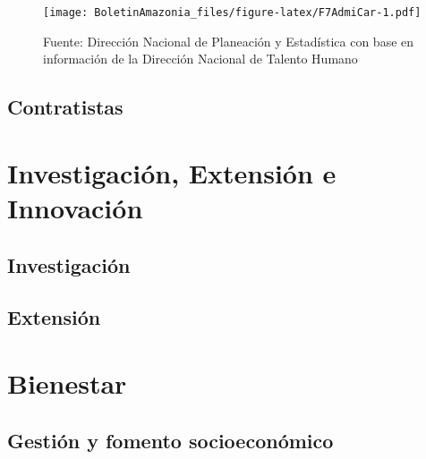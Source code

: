 \documentclass[
]{book}
\begin{document}
\begin{figure}
\centering
\texttt{[image: BoletinAmazonia\_files/figure-latex/F7AdmiCar-1.pdf]}
\caption{\label{fig:F7AdmiCar}Fuente: Dirección Nacional de Planeación y Estadística con base en información de la Dirección Nacional de Talento Humano}
\end{figure}

\hypertarget{Contrat}{%
\section{Contratistas}\label{Contrat}}

\hypertarget{Inv}{%
\chapter{Investigación, Extensión e Innovación}\label{Inv}}

\hypertarget{investigaciuxf3n}{%
\section{Investigación}\label{investigaciuxf3n}}

\hypertarget{extensiuxf3n}{%
\section{Extensión}\label{extensiuxf3n}}

\hypertarget{Bie}{%
\chapter{Bienestar}\label{Bie}}

\hypertarget{gestiuxf3n-y-fomento-socioeconuxf3mico}{%
\section{Gestión y fomento socioeconómico}\label{gestiuxf3n-y-fomento-socioeconuxf3mico}}

  
\end{document}
